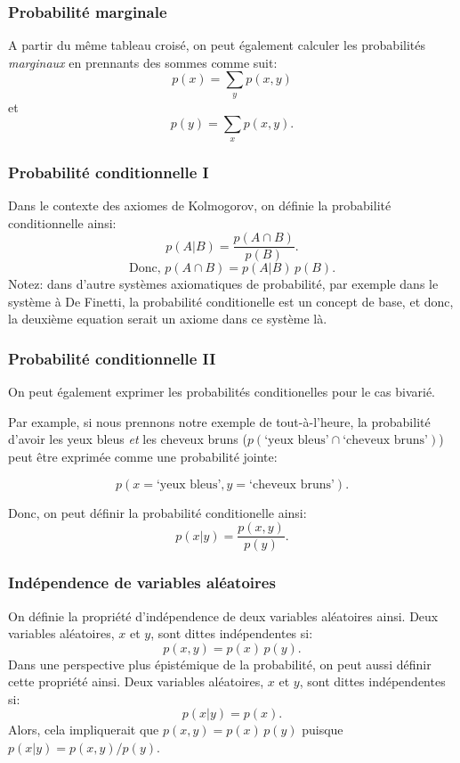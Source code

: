 \documentclass{beamer}
\begin{document}
\begin{frame}
    \frametitle{Probabilité marginale}
    A partir du même tableau croisé, on peut également calculer les probabilités \emph{marginaux} en prennants des sommes comme suit:
    \pause
    \[p(x) = \sum_y p(x,y)\]
    \pause
    et
    \[p(y) = \sum_x p(x,y).\]
\end{frame}


\begin{frame}
    \frametitle{Probabilité conditionnelle I}
    Dans le contexte des axiomes de Kolmogorov, on définie la probabilité conditionnelle ainsi:
    \[p(A | B) = \frac{p(A \cap B)}{p(B)}.\]
    \pause
    \[\textrm{Donc,} \, \, p(A \cap B) = p(A | B) \, p(B).\]
    \pause
    \vfill
    Notez: dans d'autre systèmes axiomatiques de probabilité, par exemple dans le système à De Finetti,
    la probabilité conditionelle est un concept de base, et donc, la deuxième equation serait un axiome dans
    ce système là.
\end{frame}


\begin{frame}
    \frametitle{Probabilité conditionnelle II}
    On peut également exprimer les probabilités conditionelles pour le cas bivarié.

    \vfill

    \pause

    Par example, si nous prennons notre exemple de tout-à-l'heure, la probabilité d'avoir
    les yeux bleus \emph{et} les cheveux bruns ($p(\textrm{`yeux bleus'} \cap \textrm{`cheveux bruns'})$) peut
    être exprimée comme une probabilité jointe:

    \[p(x=\textrm{`yeux bleus'}, y=\textrm{`cheveux bruns'}).\]

    \pause

    \vfill

    Donc, on peut définir la probabilité conditionelle ainsi:
    \[p(x | y) = \frac{p(x,y)}{p(y)}.\]
\end{frame}


\begin{frame}
    \frametitle{Indépendence de variables aléatoires}
    On définie la propriété d'indépendence de deux variables aléatoires ainsi.
    Deux variables aléatoires, $x$ et $y$, sont dittes indépendentes si:
    \[p(x,y) = p(x) \, p(y).\]
    \pause
    \vfill
    Dans une perspective plus épistémique de la probabilité, on peut aussi définir cette propriété ainsi.
    Deux variables aléatoires, $x$ et $y$, sont dittes indépendentes si:
    \[p(x|y) = p(x).\]
    \pause
    \vfill
    Alors, cela impliquerait que $p(x,y) = p(x) \, p(y)$ puisque $p(x|y) = p(x,y) / p(y)$.
\end{frame}
\end{document}
